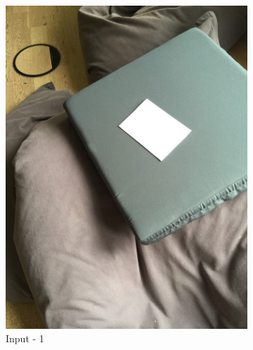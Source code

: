 \documentclass[paper=a4, fontsize=10pt]{scrartcl} %
\numberwithin{equation}{section} %
\numberwithin{figure}{section} %
\begin{document}
\begin{figure}
	\centering
	\begin{subfigure}[b]{0.35\textwidth}
		\includegraphics[width=\textwidth]{01}
		\caption{Input - 1}
		\label{fig:input_01}
	\end{subfigure}
	~ 
	\begin{subfigure}[b]{0.35\textwidth}

\end{subfigure}
\end{figure}
\end{document}
